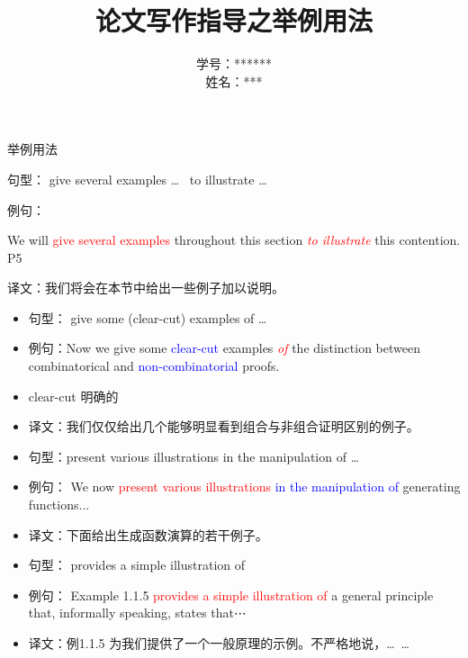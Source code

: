 \documentclass[punct]{ctexbeamer}
\title{论文写作指导之{举例用法}}
\author[学号~姓名]{学号：****** \\[8pt]姓名：***}
\date[]{}
\newcommand{\red}[1]{\textcolor{red}{#1}}
\newcommand{\blue}[1]{\textcolor{blue}{#1}}
\begin{document}
\maketitle

\begin{frame}{举例用法}

\begin{itemize}
\item
句型： give several examples  \dots  ~ to illustrate \dots

\item 例句：{We will \red{give several examples }throughout this section \emph{\red{to illustrate}} this contention.  P5
	
\item  译文：我们将会在本节中给出一些例子加以说明。}
\end{itemize}
\vspace{15pt}



\begin{itemize}
\item 
句型： give some  (clear-cut) examples  of \dots

\item 例句：Now we give some \blue{ clear-cut} examples \emph{\red{of}} the distinction between combinatorical and \blue{non-combinatorial} proofs.

 \item   clear-cut 明确的
    
\item  译文：我们仅仅给出几个能够明显看到组合与非组合证明区别的例子。
\end{itemize}
\end{frame}

\begin{frame}

\begin{itemize}
\item 
句型：present various illustrations in the manipulation of  \dots
\item 
例句： We now \red{present various illustrations }\blue{in the manipulation of} generating functions...
\item 
译文：下面给出生成函数演算的若干例子。
\end{itemize}

\vspace{15pt}

\begin{itemize}
\item 
句型： provides a simple illustration of



\item 
例句： Example 1.1.5 \red{provides a simple illustration of} a general principle that, informally speaking, states that⋯
\item 
译文：例1.1.5 为我们提供了一个一般原理的示例。不严格地说，\dots~\dots~
\end{itemize}
\end{frame}
\end{document}
